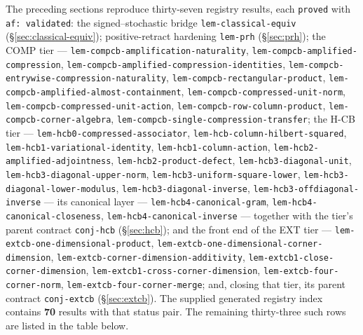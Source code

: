 The preceding sections reproduce thirty-seven registry results, each \texttt{proved} with
\texttt{af: validated}: the signed--stochastic bridge
\texttt{lem-classical-equiv} (\S\ref{sec:classical-equiv});
positive-retract hardening \texttt{lem-prh} (\S\ref{sec:prh}); the COMP tier ---
\texttt{lem-compcb-amplification-naturality},
\texttt{lem-compcb-amplified-compression},
\texttt{lem-compcb-amplified-compression-identities},
\texttt{lem-compcb-entrywise-compression-naturality},
\texttt{lem-compcb-rectangular-product},
\texttt{lem-compcb-amplified-almost-containment},
\texttt{lem-compcb-compressed-unit-norm},
\texttt{lem-compcb-compressed-unit-action},
\texttt{lem-compcb-row-column-product},
\texttt{lem-compcb-corner-algebra},
\texttt{lem-compcb-single-compression-transfer};
the H-CB tier ---
\texttt{lem-hcb0-compressed-associator},
\texttt{lem-hcb-column-hilbert-squared},
\texttt{lem-hcb1-variational-identity},
\texttt{lem-hcb1-column-action},
\texttt{lem-hcb2-amplified-adjointness},
\texttt{lem-hcb2-product-defect},
\texttt{lem-hcb3-diagonal-unit},
\texttt{lem-hcb3-diagonal-upper-norm},
\texttt{lem-hcb3-uniform-square-lower},
\texttt{lem-hcb3-diagonal-lower-modulus},
\texttt{lem-hcb3-diagonal-inverse},
\texttt{lem-hcb3-offdiagonal-inverse} ---
its canonical layer ---
\texttt{lem-hcb4-canonical-gram},
\texttt{lem-hcb4-canonical-closeness},
\texttt{lem-hcb4-canonical-inverse} ---
together with the tier's parent contract \texttt{conj-hcb} (\S\ref{sec:hcb}); and the
front end of the EXT tier ---
\texttt{lem-extcb-one-dimensional-product},
\texttt{lem-extcb-one-dimensional-corner-dimension},
\texttt{lem-extcb-corner-dimension-additivity},
\texttt{lem-extcb1-close-corner-dimension},
\texttt{lem-extcb1-cross-corner-dimension},
\texttt{lem-extcb-four-corner-norm},
\texttt{lem-extcb-four-corner-merge};
and, closing that tier, its parent contract \texttt{conj-extcb} (\S\ref{sec:extcb}).
The supplied generated registry index contains \textbf{70} results with that status pair.
The remaining thirty-three such rows are listed in the table below.

